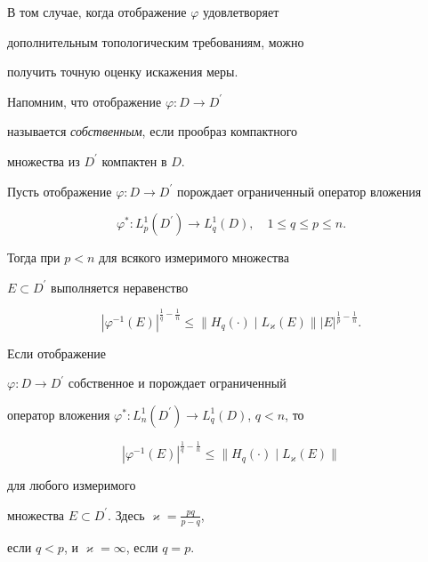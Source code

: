 В том случае, когда отображение $\varphi$ удовлетворяет


дополнительным топологическим требованиям, можно


получить точную оценку искажения меры.





Напомним, что отображение $\varphi : D\to D^{\prime}$


называется {\it собственным}, если прообраз компактного


множества из $D^{\prime}$ компактен в $D$.





\begin{thm}


Пусть отображение $\varphi :


D\to D^{\prime}$ порождает ограниченный оператор вложения


$$


\varphi^{\ast} : L^1_p(D^{\prime})\to L^1_q(D),\quad 1\leq q\leq


p\leq n.


$$


Тогда при $p<n$ для всякого измеримого множества


$E\subset D^{\prime}$ выполняется неравенство


$$


|\varphi^{-1}(E)|^{\frac{1}{q} - \frac{1}{n}} \leq \|H_q(\cdot)\mid


L_\varkappa(E)\| |E|^{\frac{1}{p} -\frac{1}{n}}.


$$


Если отображение


$\varphi : D\to D^{\prime}$ собственное и порождает ограниченный


оператор вложения $\varphi^{\ast} : L^1_n(D^{\prime})\to


L^1_q(D)$, $q<n$, то


$$


|\varphi^{-1}(E)|^{\frac{1}{q} -\frac{1}{n}}


\leq \|H_q(\cdot)\mid L_\varkappa(E)\|


$$


для любого измеримого


множества $E\subset D^{\prime}$. Здесь $\varkappa=\frac{pq}{p-q}$,


если $q<p$, и $\varkappa=\infty$, если $q=p$.


\end{thm}





